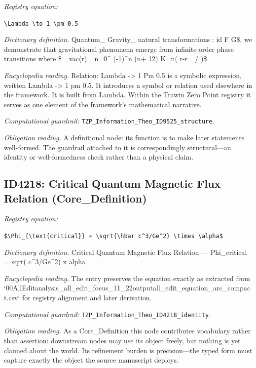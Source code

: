 \documentclass[11pt]{article}
\theoremstyle{remark}
\begin{document}
\noindent\textit{Registry equation:}\par
{\small\texttt{\textbackslash{}Lambda \textbackslash{}to 1 \textbackslash{}pm 0.5}}\par\medskip
\noindent\textit{Dictionary definition.} Quantum\_ Gravity\_ natural transformations : id F G\$, we demonstrate that gravitational phenomena emerge from infinite-order phase transitions where \$ \_vac(r) \_n=0\textasciicircum{} (-1)\textasciicircum{}n (n+ 12) K\_n( r-r\_ / )\$.\par\medskip
\noindent\textit{Encyclopedia reading.} Relation: Lambda -> 1 Pm 0.5 is a symbolic expression, written Lambda -> 1 pm 0.5. It introduces a symbol or relation used elsewhere in the framework. It is built from Lambda. Within the Trawin Zero Point registry it serves as one element of the framework's mathematical narrative.
\par\medskip\noindent\textit{Computational guardrail:} \texttt{TZP\_Information\_Theo\_ID9525\_structure}.
\par\medskip\noindent\textit{Obligation reading.} A definitional node: its function is to make later statements well-formed. The guardrail attached to it is correspondingly structural---an identity or well-formedness check rather than a physical claim.

\subsection{ID4218: Critical Quantum Magnetic Flux Relation (Core\_Definition)}

\noindent\textit{Registry equation:}\par
{\small\texttt{\$\textbackslash{}Phi\_\{\textbackslash{}text\{critical\}\} = \textbackslash{}sqrt\{\textbackslash{}hbar c\textasciicircum{}3/Ge\textasciicircum{}2\} \textbackslash{}times \textbackslash{}alpha\$}}\par\medskip
\noindent\textit{Dictionary definition.} Critical Quantum Magnetic Flux Relation --- Phi\_critical = sqrt( c\textasciicircum{}3/Ge\textasciicircum{}2) x alpha\par\medskip
\noindent\textit{Encyclopedia reading.} The entry preserves the equation exactly as extracted from `00AllEditanalysis\_all\_edit\_focus\_11\_22outputall\_edit\_equation\_arc\_compact.csv` for registry alignment and later derivation.
\par\medskip\noindent\textit{Computational guardrail:} \texttt{TZP\_Information\_Theo\_ID4218\_identity}.
\par\medskip\noindent\textit{Obligation reading.} As a Core\_Definition this node contributes vocabulary rather than assertion: downstream nodes may use its object freely, but nothing is yet claimed about the world. Its refinement burden is precision---the typed form must capture exactly the object the source manuscript deploys.
\end{document}

